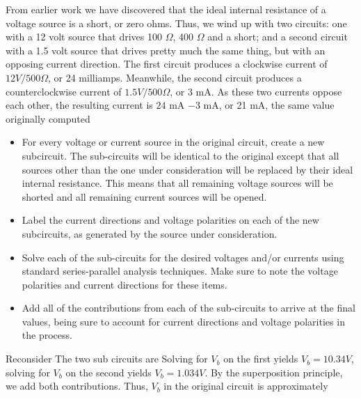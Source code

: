 \documentclass{report}
\begin{document}
\begin{itemize}
            From earlier work we have discovered that the ideal internal resistance of a voltage source is a short, or zero ohms. Thus, we wind up with two circuits: one with a 12 volt source that drives 100 $\Omega$, 400 $\Omega$ and a short; and a second circuit with a 1.5 volt source that drives pretty much the same thing, but with an opposing current direction.
            \bigbreak \noindent 
            The first circuit produces a clockwise current of $12 V/ 500 \Omega$, or 24 milliamps. Meanwhile, the second circuit produces a counterclockwise current of $1.5 V / 500 \Omega$, or 3 mA. As these two currents oppose each other, the resulting current is $24$ mA $- 3$ mA, or 21 mA, the same value originally computed
            \begin{itemize}
                \item For every voltage or current source in the original circuit, create a new subcircuit. The sub-circuits will be identical to the original except that all sources other than the one under consideration will be replaced by their ideal internal resistance. This means that all remaining voltage sources will be shorted and all remaining current sources will be opened.
                \item Label the current directions and voltage polarities on each of the new subcircuits, as generated by the source under consideration.
                \item Solve each of the sub-circuits for the desired voltages and/or currents using standard series-parallel analysis techniques. Make sure to note the voltage polarities and current directions for these items.
                \item Add all of the contributions from each of the sub-circuits to arrive at the final values, being sure to account for current directions and voltage polarities in the process.
            \end{itemize}
            Reconsider
            \bigbreak \noindent 
            \bigbreak \noindent 
            The two sub circuits are
            \bigbreak \noindent 
            \bigbreak \noindent 
            \bigbreak \noindent 
            Solving for $V_{b}$ on the first yields $V_{b} = 10.34V$, solving for $V_{b}$ on the second yields $V_{b} = 1.034V$. By the superposition principle, we add both contributions. Thus, $V_{b}$ in the original circuit is approximately
            \begin{align*}

\end{align*}
\end{itemize}
\end{document}
